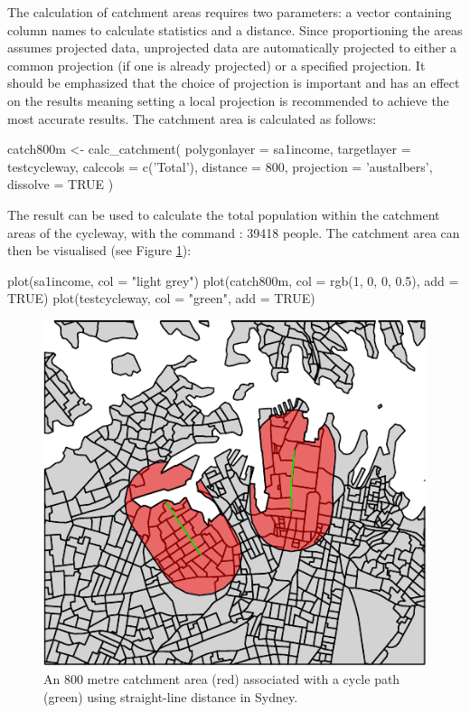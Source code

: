 The calculation of catchment areas requires two parameters:
a vector containing column names
to calculate statistics and a distance. Since proportioning
the areas assumes projected data, unprojected data are automatically
projected to either a common projection (if one is already projected) or
a specified projection. It should be emphasized that the choice of
projection is important and has an effect on the results meaning setting
a local projection is recommended to achieve the most accurate results.
The catchment area is calculated as follows:

\begin{Schunk}
\begin{Sinput}
catch800m <- calc_catchment(
  polygonlayer = sa1income,
  targetlayer = testcycleway,
  calccols = c('Total'),
  distance = 800,
  projection = 'austalbers',
  dissolve = TRUE
)
\end{Sinput}
\end{Schunk}

The result can be used to calculate the total population within the
catchment areas of the cycleway, with the command : 39418 people.
The catchment area can then be visualised (see
Figure \ref{fig:catchmentplot}):

\begin{Schunk}
\begin{Sinput}
plot(sa1income, col = "light grey")
plot(catch800m, col = rgb(1, 0, 0, 0.5), add = TRUE)
plot(testcycleway, col = "green", add = TRUE)
\end{Sinput}
\begin{figure}
\includegraphics[center]{catchmentplot-1} \caption[An 800 metre catchment area (red) associated with a cycle path (green) using straight-line distance in Sydney]{An 800 metre catchment area (red) associated with a cycle path (green) using straight-line distance in Sydney.}\label{fig:catchmentplot}
\end{figure}
\end{Schunk}

